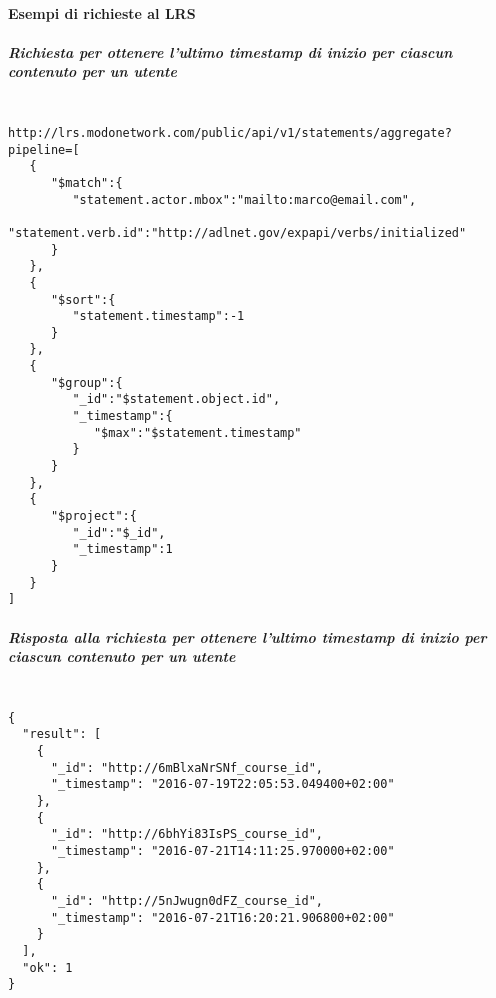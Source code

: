 \paragraph{Esempi di richieste al LRS}
    \subparagraph*{Richiesta per ottenere l'ultimo timestamp di inizio per ciascun contenuto per un utente\\\\}
    \begin{lstlisting}
http://lrs.modonetwork.com/public/api/v1/statements/aggregate?pipeline=[
   {
      "$match":{
         "statement.actor.mbox":"mailto:marco@email.com",
         "statement.verb.id":"http://adlnet.gov/expapi/verbs/initialized"
      }
   },
   {
      "$sort":{
         "statement.timestamp":-1
      }
   },
   {
      "$group":{
         "_id":"$statement.object.id",
         "_timestamp":{
            "$max":"$statement.timestamp"
         }
      }
   },
   {
      "$project":{
         "_id":"$_id",
         "_timestamp":1
      }
   }
]
    \end{lstlisting}
    \subparagraph*{Risposta alla richiesta per ottenere l'ultimo timestamp di inizio per ciascun contenuto per un utente\\\\}
    \begin{lstlisting}
{
  "result": [
    {
      "_id": "http://6mBlxaNrSNf_course_id",
      "_timestamp": "2016-07-19T22:05:53.049400+02:00"
    },
    {
      "_id": "http://6bhYi83IsPS_course_id",
      "_timestamp": "2016-07-21T14:11:25.970000+02:00"
    },
    {
      "_id": "http://5nJwugn0dFZ_course_id",
      "_timestamp": "2016-07-21T16:20:21.906800+02:00"
    }
  ],
  "ok": 1
}
    \end{lstlisting}

